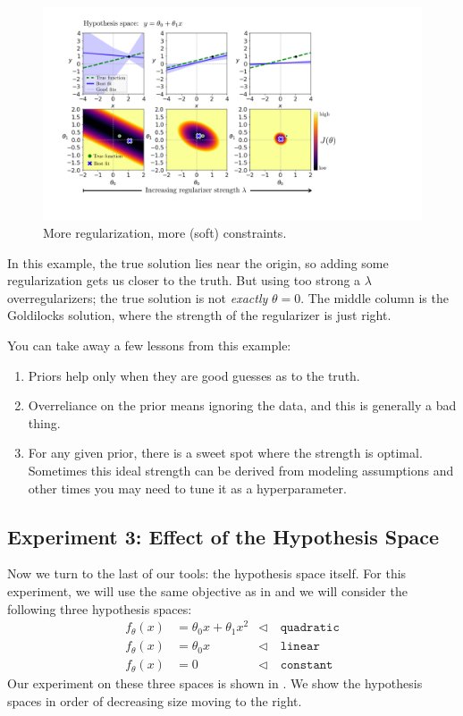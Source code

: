\begin{figure}[t]
    \centerline{
    \includegraphics[width=1.0\linewidth]{./figures/problem_of_generalization/more_regularizer_more_constraints.pdf}
    }
    \caption{More regularization, more (soft) constraints.}
    \label{fig:problem_of_generalization:more_regularizer_more_constraints}
\end{figure}

In this example, the true solution lies near the origin, so adding some regularization gets us closer to the truth. But using too strong a $\lambda$ overregularizers; the true solution is not \textit{exactly} $\theta=0$. The middle column is the Goldilocks solution, where the strength of the regularizer is just right.

You can take away a few lessons from this example:
\begin{enumerate}
    \item Priors help only when they are good guesses as to the truth.
    \item Overreliance on the prior means ignoring the data, and this is generally a bad thing.
    \item For any given prior, there is a sweet spot where the strength is optimal. Sometimes this ideal strength can be derived from modeling assumptions and other times you may need to tune it as a hyperparameter.
\end{enumerate}

\subsection{Experiment 3: Effect of the Hypothesis Space}

Now we turn to the last of our tools: the hypothesis space itself. For this experiment, we will use the same objective as in \eqn{\ref{eqn:problem_of_generalization:error_fn_1}} and we will consider the following three hypothesis spaces:
\begin{align}
    f_{\theta}(x) &= \theta_0 x + \theta_1 x^2 &\triangleleft \quad\texttt{quadratic}\\
    f_{\theta}(x) &= \theta_0 x &\triangleleft \quad\texttt{linear}\\
    f_{\theta}(x) &= 0 &\triangleleft \quad\texttt{constant}
\end{align}
Our experiment on these three spaces is shown in \fig{\ref{fig:problem_of_generalization:fewer_hypotheses_more_constraints}}. We show the hypothesis spaces in order of decreasing size moving to the right.

